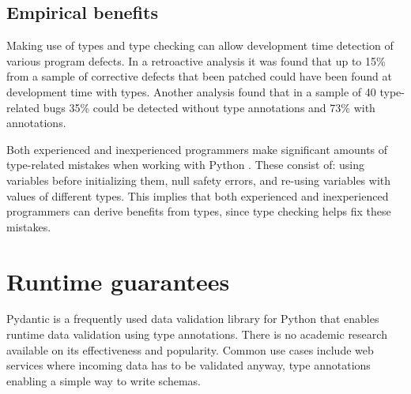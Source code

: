\subsection{Empirical benefits}

Making use of types and type checking can allow development time detection of various program defects. In a retroactive analysis it was found that up to 15\% from a sample of corrective defects that been patched could have been found at development time with types\cite{khan_empirical_2022}. Another analysis \cite{xu_how_well_static_2023} found that in a sample of 40 type-related bugs 35\% could be detected without type annotations and 73\% with annotations.


Both experienced and inexperienced programmers make significant amounts of type-related mistakes when working with Python \cite{khan_empirical_2022}. These consist of: using variables before initializing them, null safety errors, and re-using variables with values of different types. This implies that both experienced and inexperienced programmers can derive benefits from types, since type checking helps fix these mistakes.


\section{Runtime guarantees}

Pydantic is a frequently used data validation library for Python that enables runtime data validation using type annotations\cite{pydanticdev_welcome_nodate}. There is no academic research available on its effectiveness and popularity. Common use cases include web services where incoming data has to be validated anyway, type annotations enabling a simple way to write schemas.

